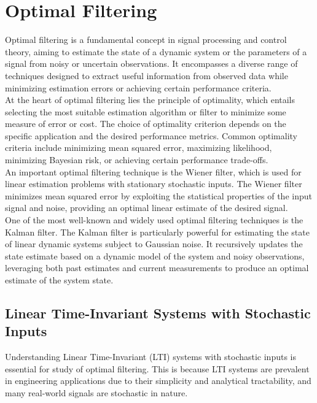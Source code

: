 \documentclass[12pt]{book}
\theoremstyle{definition}
\begin{document}
\chapter{Optimal Filtering}

Optimal filtering is a fundamental concept in signal processing and control theory, aiming to estimate the state of a dynamic system or the parameters of a signal from noisy or uncertain observations. It encompasses a diverse range of techniques designed to extract useful information from observed data while minimizing estimation errors or achieving certain performance criteria. \\

At the heart of optimal filtering lies the principle of optimality, which entails selecting the most suitable estimation algorithm or filter to minimize some measure of error or cost. The choice of optimality criterion depends on the specific application and the desired performance metrics. Common optimality criteria include minimizing mean squared error, maximizing likelihood, minimizing Bayesian risk, or achieving certain performance trade-offs.\\

An important optimal filtering technique is the Wiener filter, which is used for linear estimation problems with stationary stochastic inputs. The Wiener filter minimizes mean squared error by exploiting the statistical properties of the input signal and noise, providing an optimal linear estimate of the desired signal.\\

One of the most well-known and widely used optimal filtering techniques is the Kalman filter. The Kalman filter is particularly powerful for estimating the state of linear dynamic systems subject to Gaussian noise. It recursively updates the state estimate based on a dynamic model of the system and noisy observations, leveraging both past estimates and current measurements to produce an optimal estimate of the system state. \\




\section{Linear Time-Invariant Systems with Stochastic Inputs}

Understanding Linear Time-Invariant (LTI) systems with stochastic inputs is essential for study of optimal filtering. This is because LTI systems are prevalent in engineering applications due to their simplicity and analytical tractability, and many real-world signals are stochastic in nature.\\
\end{document}
